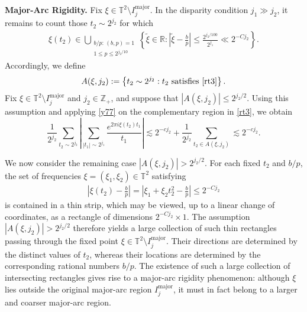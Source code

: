 \documentclass[10pt,a4paper]{amsart}
\numberwithin{equation}{section}
\begin{document}
\noindent\textbf{Major-Arc Rigidity.}
Fix $\xi\in \mathbb{T}^2\setminus I^{\mathrm{major}}_{j}$.  In the disparity condition $j_1\gg j_2$, it remains to count those $t_2 \sim 2^{j_2}$ for which  	\begin{align}\label{rt3} 
	\xi(t_2) \in \bigcup_{\substack{b/p:\,(b,p)=1\\ 1\le p\le 2^{j_2/10}}} \left\{ \widetilde{\xi}\in\mathbb{R}: \left| \widetilde{\xi}-\frac{b}{p} \right| \le \frac{2^{j_2/100}}{2^{j_1}} \ll 2^{-Cj_2} \right\}.
\end{align}
Accordingly, we define \begin{align*} 
	A(\xi,j_2) := \left\{ t_2\sim 2^{j_2}: t_2 \text{ satisfies \eqref{rt3}} \right\}. 
	\end{align*} Fix $\xi\in\mathbb{T}^2\setminus I_j^{\mathrm{major}}$ and $j_2\in\mathbb{Z}_+$, and suppose that $|A(\xi,j_2)|\leq 2^{j_2/2}.$ Using this assumption and  applying  \eqref{y77} on the complementary region in \eqref{rt3}, we obtain $$\frac{1}{2^{j_2}}\sum_{t_2\sim 2^{j_2}}\left|\sum_{|t_1|\sim 2^{j_1}}\frac{e^{2\pi i\xi(t_2)t_1}}{t_1}\right|\lesssim 2^{-cj_2}+ \frac{1}{2^{j_2}}\sum_{t_2\in A(\xi,j_2)}\lesssim  2^{-cj_2}.$$


We now consider the remaining case $|A(\xi,j_2)|>2^{j_2/2}.$
For each fixed $t_2$ and $b/p$, the set of frequencies
$\xi=(\xi_1,\xi_2)\in\mathbb{T}^2$ satisfying
\begin{align*}
	\left|
	\xi(t_2)-\frac{b}{p}
	\right|
	=
	\left|
	\xi_1+\xi_2t_2^2-\frac{b}{p}
	\right|
	\le 2^{-Cj_2}
\end{align*}
is contained in a thin strip, which may be viewed, up to a linear
change of coordinates, as a rectangle of dimensions
$2^{-Cj_2}\times 1$.
The assumption $|A(\xi,j_2)|>2^{j_2/2}$ therefore yields a large
collection of such thin rectangles passing through the fixed point
$
\xi\in\mathbb{T}^2\setminus I_j^{\mathrm{major}}.$
Their directions are determined by the distinct values of $t_2$,
whereas their locations are determined by the corresponding rational
numbers $b/p$. The existence of such a large collection of intersecting
rectangles gives rise to a major-arc rigidity phenomenon: although
$\xi$ lies outside the original major-arc region
$I_j^{\mathrm{major}}$, it must in fact belong to a larger and coarser
major-arc region.
\end{document}
